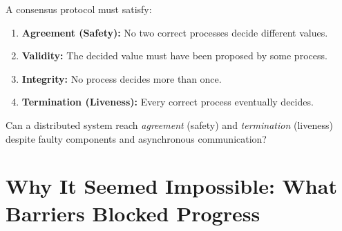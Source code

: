 \begin{definition}
A consensus protocol must satisfy:
\begin{enumerate}
\item \textbf{Agreement (Safety):} No two correct processes decide different values.
\item \textbf{Validity:} The decided value must have been proposed by some process.
\item \textbf{Integrity:} No process decides more than once.
\item \textbf{Termination (Liveness):} Every correct process eventually decides.
\end{enumerate}
\end{definition}

Can a distributed system reach \emph{agreement} (safety) and \emph{termination} (liveness) despite faulty components and asynchronous communication?

\section{Why It Seemed Impossible: What Barriers Blocked Progress}
\label{sec:consensus:impossible}

